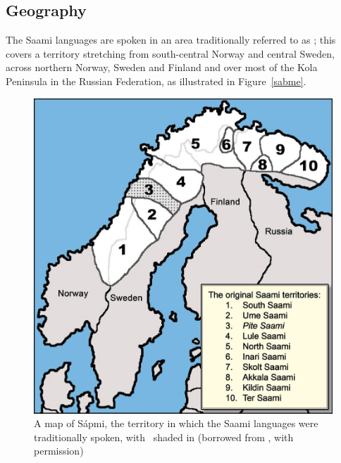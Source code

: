 \subsection{Geography}\label{geography}
The Saami languages are spoken in an area traditionally referred to as ; this covers a territory stretching from south-central Norway and central Sweden, across northern Norway, Sweden and Finland and over most of the Kola Peninsula in the Russian Federation, as illustrated in Figure~\vref{sabme}. 
\begin{figure}
\centering
\includegraphics[width=.5\textwidth]{images/SaamiTerritoryMapPiteENsmall.jpg}
\caption[A map of , the territory in which the Saami Languages were traditionally spoken]{A map of Sápmi, the territory in which the Saami languages were traditionally spoken, with \PS\ shaded in (borrowed from \mbox{\citealt[]{BullEtal2007}}, with permission)}\label{sabme}
\end{figure}


